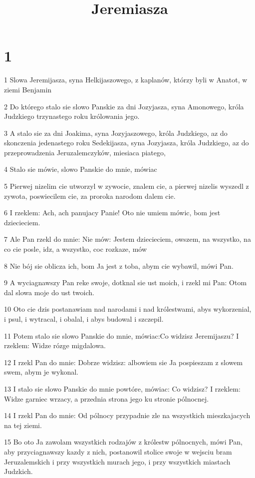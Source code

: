 

\title{Jeremiasza}


\chapter{1}

\par 1 Slowa Jeremijasza, syna Helkijaszowego, z kaplanów, którzy byli w Anatot, w ziemi Benjamin
\par 2 Do którego stalo sie slowo Panskie za dni Jozyjasza, syna Amonowego, króla Judzkiego trzynastego roku królowania jego.
\par 3 A stalo sie za dni Joakima, syna Jozyjaszowego, króla Judzkiego, az do skonczenia jedenastego roku Sedekijasza, syna Jozyjasza, króla Judzkiego, az do przeprowadzenia Jeruzalemczyków, miesiaca piatego,
\par 4 Stalo sie mówie, slowo Panskie do mnie, mówiac
\par 5 Pierwej nizelim cie utworzyl w zywocie, znalem cie, a pierwej nizelis wyszedl z zywota, poswiecilem cie, za proroka narodom dalem cie.
\par 6 I rzeklem: Ach, ach panujacy Panie! Oto nie umiem mówic, bom jest dziecieciem.
\par 7 Ale Pan rzekl do mnie: Nie mów: Jestem dziecieciem, owszem, na wszystko, na co cie posle, idz, a wszystko, coc rozkaze, mów
\par 8 Nie bój sie oblicza ich, bom Ja jest z toba, abym cie wybawil, mówi Pan.
\par 9 A wyciagnawszy Pan reke swoje, dotknal sie ust moich, i rzekl mi Pan: Otom dal slowa moje do ust twoich.
\par 10 Oto cie dzis postanawiam nad narodami i nad królestwami, abys wykorzenial, i psul, i wytracal, i obalal, i abys budowal i szczepil.
\par 11 Potem stalo sie slowo Panskie do mnie, mówiac:Co widzisz Jeremijaszu? I rzeklem: Widze rózge migdalowa.
\par 12 I rzekl Pan do mnie: Dobrze widzisz: albowiem sie Ja pospieszam z slowem swem, abym je wykonal.
\par 13 I stalo sie slowo Panskie do mnie powtóre, mówiac: Co widzisz? I rzeklem: Widze garniec wrzacy, a przednia strona jego ku stronie pólnocnej.
\par 14 I rzekl Pan do mnie: Od pólnocy przypadnie zle na wszystkich mieszkajacych na tej ziemi.
\par 15 Bo oto Ja zawolam wszystkich rodzajów z królestw pólnocnych, mówi Pan, aby przyciagnawszy kazdy z nich, postanowil stolice swoje w wejsciu bram Jeruzalemskich i przy wszystkich murach jego, i przy wszystkich miastach Judzkich.
